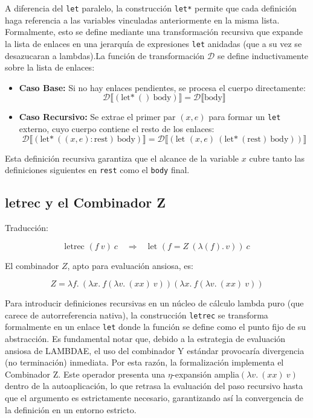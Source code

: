\documentclass[a4paper,12pt]{article}
\begin{document}
\begin{tcolorbox}[title= Corrección: Desugar modulo A4, breakable]
\begin{enumerate}
\vspace{0,5 cm}\textbf{} A diferencia del \texttt{let} paralelo, la construcción \texttt{let*} permite que cada definición haga referencia a las variables vinculadas anteriormente en la misma lista. Formalmente, esto se define mediante una transformación recursiva que expande la lista de enlaces en una jerarquía de expresiones \texttt{let} anidadas (que a su vez se desazucaran a lambdas).La función de transformación $\mathcal{D}$ se define inductivamente sobre la lista de enlaces:\begin{itemize} \item \textbf{Caso Base:} Si no hay enlaces pendientes, se procesa el cuerpo directamente:$$ \mathcal{D}\llbracket (\text{let*} \ () \ \text{body}) \rrbracket = \mathcal{D}\llbracket \text{body} \rrbracket $$\item \textbf{Caso Recursivo:} Se extrae el primer par $(x, e)$ para formar un \texttt{let} externo, cuyo cuerpo contiene el resto de los enlaces:$$ \mathcal{D}\llbracket (\text{let*} \ ((x, e) : \text{rest}) \ \text{body}) \rrbracket = \mathcal{D}\llbracket (\text{let } (x, e) \ (\text{let*} \ (\text{rest}) \ \text{body})) \rrbracket $$\end{itemize}Esta definición recursiva garantiza que el alcance de la variable $x$ cubre tanto las definiciones siguientes en \texttt{rest} como el \texttt{body} final.

\subsection{letrec y el Combinador Z}

Traducción:

\[
\text{letrec } (f\ v)\ c
\quad\Rightarrow\quad
\text{let } (f = Z\ (\lambda(f).\, v))\ c
\]

El combinador \(Z\), apto para evaluación ansiosa, es:

\[
Z = \lambda f.\ 
      (\lambda x.\ f(\lambda v.\ (x x)\ v))
      (\lambda x.\ f(\lambda v.\ (x x)\ v))
\]

\vspace{0,5 cm}\textbf{} Para introducir definiciones recursivas en un núcleo de cálculo lambda puro (que carece de autorreferencia nativa), la construcción \texttt{letrec} se transforma formalmente en un enlace \texttt{let} donde la función se define como el punto fijo de su abstracción. Es fundamental notar que, debido a la estrategia de evaluación ansiosa  de LAMBDAE, el uso del combinador Y estándar provocaría divergencia (no terminación) inmediata. Por esta razón, la formalización implementa el Combinador Z. Este operador presenta una $\eta$-expansión amplia$(\lambda v.\ (x x)\ v)$dentro de la autoaplicación, lo que retrasa la evaluación del paso recursivo hasta que el argumento es estrictamente necesario, garantizando así la convergencia de la definición en un entorno estricto.


\end{enumerate}
\end{tcolorbox}
\end{document}
